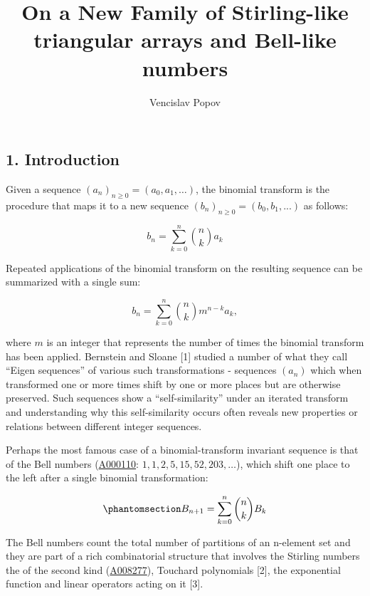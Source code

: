 \documentclass[
  letterpaper,
  DIV=11,
  numbers=noendperiod]{scrartcl}
\title{On a New Family of Stirling-like triangular arrays and Bell-like
numbers}
\author{Vencislav Popov}
\date{}
\theoremstyle{plain}
\theoremstyle{remark}
\begin{document}
\maketitle


\usepackage{amsmath}
\usepackage{logix}
\usepackage{hyperref}
\newcommand{\Stirling}[0]{\genfrac\{\}{0pt}{}}
\newcommand{\mStirling}[0]{\genfrac{\lfloor}{\rfloor}{0pt}{}}

\subsection{1. Introduction}\label{introduction}

Given a sequence \((a_n)_{n \geq 0} = (a_0, a_1, \ldots)\), the binomial
transform is the procedure that maps it to a new sequence
\((b_n)_{n \geq 0} = (b_0,b_1,...)\) as follows:

\[
b_n = \sum_{k=0}^{n} \binom{n}{k} a_k
\]

Repeated applications of the binomial transform on the resulting
sequence can be summarized with a single sum:

\[
b_n = \sum_{k=0}^{n} \binom{n}{k} m^{n-k} a_k,
\]

where \(m\) is an integer that represents the number of times the
binomial transform has been applied. Bernstein and Sloane {[}1{]}
studied a number of what they call ``Eigen sequences'' of various such
transformations - sequences \((a_n)\) which when transformed one or more
times shift by one or more places but are otherwise preserved. Such
sequences show a ``self-similarity'' under an iterated transform and
understanding why this self-similarity occurs often reveals new
properties or relations between different integer sequences.

Perhaps the most famous case of a binomial-transform invariant sequence
is that of the Bell numbers (\href{https://oeis.org/A000110}{A000110}:
\(1, 1, 2, 5, 15, 52, 203, \ldots\)), which shift one place to the left
after a single binomial transformation:

\begin{equation}\phantomsection\label{eq-bell-recurrence}{
B_{n+1} = \sum_{k=0}^{n} \binom{n}{k} B_k
}\end{equation}

The Bell numbers count the total number of partitions of an n-element
set and they are part of a rich combinatorial structure that involves
the Stirling numbers the of the second kind
(\href{https://oeis.org/A008277}{A008277}), Touchard polynomials
{[}2{]}, the exponential function and linear operators acting on it
{[}3{]}.
\end{document}
